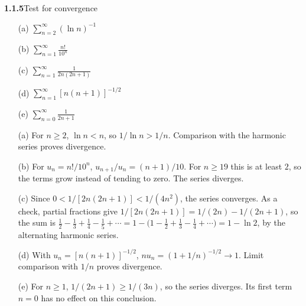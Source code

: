 \par\bigskip
\noindent\textbf{1.1.5}\quad Test for convergence
\begin{enumerate}
\item[(a)] $\displaystyle\sum_{n=2}^{\infty}(\ln n)^{-1}$
\item[(b)] $\displaystyle\sum_{n=1}^{\infty}\frac{n!}{10^{n}}$
\item[(c)] $\displaystyle\sum_{n=1}^{\infty}\frac{1}{2n(2n+1)}$
\item[(d)] $\displaystyle\sum_{n=1}^{\infty}[n(n+1)]^{-1/2}$
\item[(e)] $\displaystyle\sum_{n=0}^{\infty}\frac{1}{2n+1}$
\end{enumerate}
\solution
\begin{enumerate}
\item[(a)] For $n\ge2$, $\ln n<n$, so $1/\ln n>1/n$.
Comparison with the harmonic series proves divergence.
\item[(b)] For $u_n=n!/10^n$, $u_{n+1}/u_n=(n+1)/10$.
For $n\ge19$ this is at least $2$, so the terms grow instead of tending
to zero. The series diverges.
\item[(c)] Since $0<1/[2n(2n+1)]<1/(4n^2)$, the series converges.
As a check, partial fractions give
$1/[2n(2n+1)]=1/(2n)-1/(2n+1)$, so the sum is
$\frac12-\frac13+\frac14-\frac15+\cdots
=1-\bigl(1-\frac12+\frac13-\frac14+\cdots\bigr)=1-\ln2$,
by the alternating harmonic series.
\item[(d)] With $u_n=[n(n+1)]^{-1/2}$,
$n u_n=(1+1/n)^{-1/2}\to1$. Limit comparison with $1/n$
proves divergence.
\item[(e)] For $n\ge1$, $1/(2n+1)\ge1/(3n)$, so the series diverges.
Its first term $n=0$ has no effect on this conclusion.
\end{enumerate}


